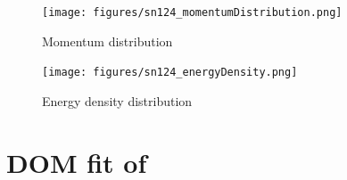 \begin{figure}[H]
    \centering
    \texttt{[image: figures/sn124\_momentumDistribution.png]}
    \caption{Momentum distribution}
    \label{DOMFitData_sn124_momentumDistribution}
\end{figure}

\begin{figure}[H]
    \centering
    \texttt{[image: figures/sn124\_energyDensity.png]}
    \caption{Energy density distribution}
    \label{DOMFitData_sn124_energyDensity}
\end{figure}

\section{DOM fit of \pbEight}

\label{pb208DOMOutput}

